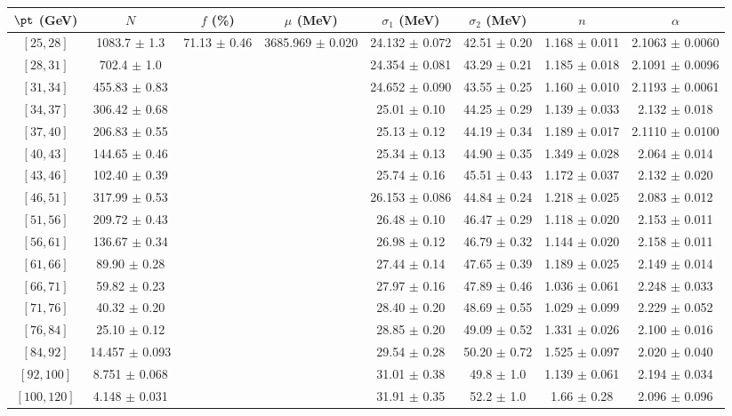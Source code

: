 \begin{tabular}{c||c|c|c|c|c|c|c}
$\pt$ (GeV) & $N$ & $f$ (\%) & $\mu$ (MeV) & $\sigma_1$ (MeV) & $\sigma_2$ (MeV) & $n$ & $\alpha$ \\
\hline
$[25, 28]$ & 1083.7 $\pm$ 1.3 & \multirow{17}{*}{71.13 $\pm$ 0.46} & \multirow{17}{*}{3685.969 $\pm$ 0.020} & 24.132 $\pm$ 0.072 & 42.51 $\pm$ 0.20 & 1.168 $\pm$ 0.011 & 2.1063 $\pm$ 0.0060\\
$[28, 31]$ & 702.4 $\pm$ 1.0 &  &  & 24.354 $\pm$ 0.081 & 43.29 $\pm$ 0.21 & 1.185 $\pm$ 0.018 & 2.1091 $\pm$ 0.0096\\
$[31, 34]$ & 455.83 $\pm$ 0.83 &  &  & 24.652 $\pm$ 0.090 & 43.55 $\pm$ 0.25 & 1.160 $\pm$ 0.010 & 2.1193 $\pm$ 0.0061\\
$[34, 37]$ & 306.42 $\pm$ 0.68 &  &  & 25.01 $\pm$ 0.10 & 44.25 $\pm$ 0.29 & 1.139 $\pm$ 0.033 & 2.132 $\pm$ 0.018\\
$[37, 40]$ & 206.83 $\pm$ 0.55 &  &  & 25.13 $\pm$ 0.12 & 44.19 $\pm$ 0.34 & 1.189 $\pm$ 0.017 & 2.1110 $\pm$ 0.0100\\
$[40, 43]$ & 144.65 $\pm$ 0.46 &  &  & 25.34 $\pm$ 0.13 & 44.90 $\pm$ 0.35 & 1.349 $\pm$ 0.028 & 2.064 $\pm$ 0.014\\
$[43, 46]$ & 102.40 $\pm$ 0.39 &  &  & 25.74 $\pm$ 0.16 & 45.51 $\pm$ 0.43 & 1.172 $\pm$ 0.037 & 2.132 $\pm$ 0.020\\
$[46, 51]$ & 317.99 $\pm$ 0.53 &  &  & 26.153 $\pm$ 0.086 & 44.84 $\pm$ 0.24 & 1.218 $\pm$ 0.025 & 2.083 $\pm$ 0.012\\
$[51, 56]$ & 209.72 $\pm$ 0.43 &  &  & 26.48 $\pm$ 0.10 & 46.47 $\pm$ 0.29 & 1.118 $\pm$ 0.020 & 2.153 $\pm$ 0.011\\
$[56, 61]$ & 136.67 $\pm$ 0.34 &  &  & 26.98 $\pm$ 0.12 & 46.79 $\pm$ 0.32 & 1.144 $\pm$ 0.020 & 2.158 $\pm$ 0.011\\
$[61, 66]$ & 89.90 $\pm$ 0.28 &  &  & 27.44 $\pm$ 0.14 & 47.65 $\pm$ 0.39 & 1.189 $\pm$ 0.025 & 2.149 $\pm$ 0.014\\
$[66, 71]$ & 59.82 $\pm$ 0.23 &  &  & 27.97 $\pm$ 0.16 & 47.89 $\pm$ 0.46 & 1.036 $\pm$ 0.061 & 2.248 $\pm$ 0.033\\
$[71, 76]$ & 40.32 $\pm$ 0.20 &  &  & 28.40 $\pm$ 0.20 & 48.69 $\pm$ 0.55 & 1.029 $\pm$ 0.099 & 2.229 $\pm$ 0.052\\
$[76, 84]$ & 25.10 $\pm$ 0.12 &  &  & 28.85 $\pm$ 0.20 & 49.09 $\pm$ 0.52 & 1.331 $\pm$ 0.026 & 2.100 $\pm$ 0.016\\
$[84, 92]$ & 14.457 $\pm$ 0.093 &  &  & 29.54 $\pm$ 0.28 & 50.20 $\pm$ 0.72 & 1.525 $\pm$ 0.097 & 2.020 $\pm$ 0.040\\
$[92, 100]$ & 8.751 $\pm$ 0.068 &  &  & 31.01 $\pm$ 0.38 & 49.8 $\pm$ 1.0 & 1.139 $\pm$ 0.061 & 2.194 $\pm$ 0.034\\
$[100, 120]$ & 4.148 $\pm$ 0.031 &  &  & 31.91 $\pm$ 0.35 & 52.2 $\pm$ 1.0 & 1.66 $\pm$ 0.28 & 2.096 $\pm$ 0.096\\
\end{tabular}
